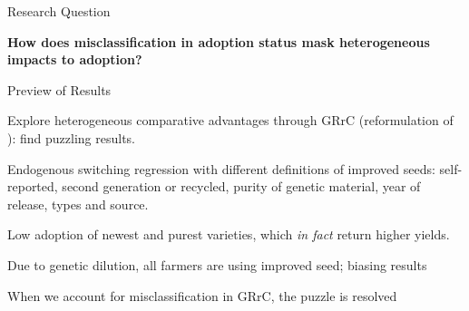 \documentclass{beamer}
\begin{document}
\begin{frame}{Research Question}

\textbf{How does misclassification in adoption status mask heterogeneous impacts to adoption?}
\end{frame}

\begin{frame}{Preview of Results}

\begin{enumerate}[ {[}1{]} ]
    \item Explore heterogeneous comparative advantages through GRrC (reformulation of \cite{Suri2011-oi}): find puzzling results.
    \item Endogenous switching regression with different definitions of improved seeds: self-reported, second generation or recycled, purity of genetic material, year of release, types and source.
    \item Low adoption of newest and purest varieties, which \textit{in fact} return higher yields. 
    \item Due to genetic dilution, all farmers are using improved seed; biasing results
    \item When we account for misclassification in GRrC, the puzzle is resolved
\end{enumerate}
\end{frame}
\end{document}
